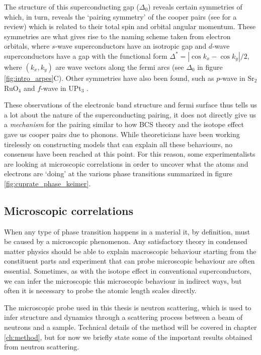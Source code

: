 The structure of this superconducting gap ($\Delta_0$) reveals certain symmetries of which, in turn, reveals the `pairing symmetry' of the cooper pairs (see \cite{Tsuei2000} for a review) which is related to their total spin and orbital angular momentum. These symmetries are what gives rise to the naming scheme taken from electron orbitals, where $s$-wave superconductors have an isotropic gap and $d$-wave superconductors have a gap with the functional form $\Delta^* = | \cos k_x - \cos k_y | / 2$, where $(k_x, k_y)$ are wave vectors along the fermi arcs (see $\Delta_0$ in figure \ref{fig:intro_arpes}C). Other symmetries have also been found, such as $p$-wave in Sr$_2$RuO$_4$ \cite{Mackenzie2003} and $f$-wave in UPt$_3$ \cite{Joynt2002}.

These observations of the electronic band structure and fermi surface thus tells us a lot about the nature of the superconducting pairing, it does not directly give us a \emph{mechanism} for the pairing similar to how BCS theory and the isotope effect gave us cooper pairs due to phonons. While theoreticians have been working tirelessly on constructing models that can explain all these behaviours, no consensus have been reached at this point. For this reason, some experimentalists are looking at microscopic correlations in order to uncover what the atoms and electrons are `doing' at the various phase transitions summarized in figure \ref{fig:cuprate_phase_keimer}.

\subsection{Microscopic correlations}
When any type of phase transition happens in a material it, by definition, must be caused by a microscopic phenomenon. Any satisfactory theory in condensed matter physics should be able to explain macroscopic behaviour starting from the constituent parts and experiment that can probe microscopic behaviour are often essential. Sometimes, as with the isotope effect in conventional superconductors, we can infer the microscopic this microscopic behaviour in indirect ways, but often it is necessary to probe the atomic length scales directly.

The microscopic probe used in this thesis is neutron scattering, which is used to infer structure and dynamics through a scattering process between a beam of neutrons and a sample. Technical details of the method will be covered in chapter \ref{ch:method}, but for now we briefly state some of the important results obtained from neutron scattering.

